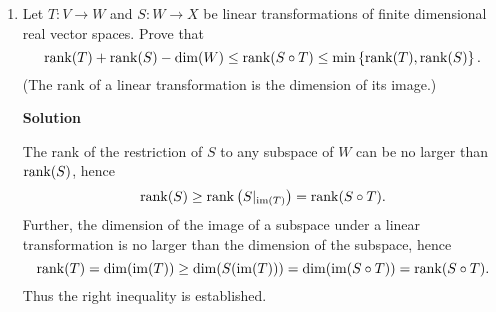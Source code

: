 \documentclass{article}
\def\rank{\mathop{\rm rank}\nolimits}
\def\im{\mathop{\rm im}\nolimits}
\begin{document}
\begin{enumerate}
{\bf Solution}

Let \(y \in F(U) \cap U\).  Then there exists some \(x \in U\) such that \(F(x) = y\), and \(F'(x)\) is nonsingular.  The Inverse Function Theorem then gives us open sets \(V \subset U\) and \(W \subset \mathbb{R}^2\), \(x \in V\), \(y \in W\), \(F\) is one-to-one on \(V\), and \(F(V) = W\).  Thus \(W \cap U \subset F(U) \cap U\) is an open (with respect to \(U\)) neighborhood of \(y\), hence \(F(U) \cap U\) is open in \(U\).

Now suppose \(y \in U\) is a limit point of \(F(U)\).  Then there exists a sequence \(\{y_n\}_{n = 1}^{\infty} \subset F(U)\) such that \(y_n \to y\).  For each \(n\), let \(x_n \in U\) such that \(F(x_n) = y_n\).  Then \(\{x_n\}_{n = 1}^{\infty}\) is a sequence within \(\overline{U}\), a compact set, hence there exists a convergent subsequence \(\{x_{n_i}\}_{i = 1}^{\infty}\) with \(x_{n_i} \to x^* \in \overline{U}\).  By the continuity of \(F\), then, \(F(x^*) = y\).  Now since \(F(\partial U) \cap U = \emptyset\), \(x^* \notin \partial U\), as \(F(x^*) = y \in U\).  Thus \(x^* \in U\) and \(y = F(x^*) \in F(U)\), showing that \(F(U) \cap U\) is closed in \(U\).

Finally, \(F(U) \cap U \neq \emptyset\), since \(F((0,0)) = (0,0)\).  Thus, as \(F(U) \cap U\) is both open and closed in \(U\), \(F(U) \cap U = U\) and \(F(U) \supset U\).



\item Let \(T : V \to W\) and \(S : W \to X\) be linear transformations of finite dimensional real vector spaces.  Prove that
\[\rank(T) + \rank(S) - \dim(W) \leq \rank(S \circ T) \leq \min \left\{ \rank(T), \rank(S) \right\}.\]
(The rank of a linear transformation is the dimension of its image.)

{\bf Solution}

The rank of the restriction of \(S\) to any subspace of \(W\) can be no larger than \(\rank(S)\), hence
\[\rank(S) \geq \rank \left( S|_{\im(T)} \right) = \rank(S \circ T).\]
Further, the dimension of the image of a subspace under a linear transformation is no larger than the dimension of the subspace, hence
\[\rank(T) = \dim(\im(T)) \geq \dim(S(\im(T))) = \dim(\im(S \circ T)) = \rank(S \circ T).\]
Thus the right inequality is established.


\end{enumerate}
\end{document}
